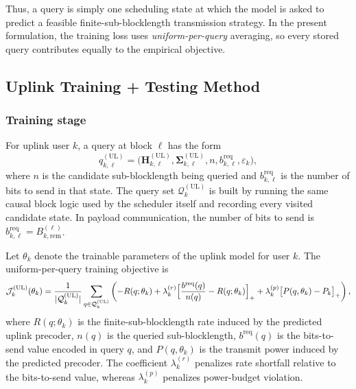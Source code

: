 \documentclass[11pt]{article}
\newcommand{\Qset}{\mathcal{Q}}
\newcommand{\Hc}{\mathbf{H}}
\newcommand{\Sig}{\mathbf{\Sigma}}
\newcommand{\UL}{\mathrm{UL}}
\begin{document}
Thus, a query is simply one scheduling state at which the model is asked to
predict a feasible finite-sub-blocklength transmission strategy. In the present
formulation, the training loss uses \emph{uniform-per-query} averaging, so every
stored query contributes equally to the empirical objective.

\subsection{Uplink Training + Testing Method}

\subsubsection{Training stage}

For uplink user $k$, a query at block $\ell$ has the form
\begin{equation}
q_{k,\ell}^{(\UL)}
=
\bigl(
\Hc_{k,\ell}^{(\UL)},
\Sig_{k,\ell}^{(\UL)},
n,
b_{k,\ell}^{\mathrm{req}},
\varepsilon_k
\bigr),
\label{eq:ul-query}
\end{equation}
where $n$ is the candidate sub-blocklength being queried and
$b_{k,\ell}^{\mathrm{req}}$ is the number of bits to send in that state. The
query set $\Qset_k^{(\UL)}$ is built by running the same causal block logic
used by the scheduler itself and recording every visited candidate state. In
payload communication, the number of bits to send is
$b_{k,\ell}^{\mathrm{req}} = B_{k,\mathrm{rem}}^{(\ell)}$.

Let $\theta_k$ denote the trainable parameters of the uplink model for user $k$.
The uniform-per-query training objective is
\begin{equation}
\mathcal{J}_k^{(\UL)}(\theta_k)
=
\frac{1}{\lvert\Qset_k^{(\UL)}\rvert}
\sum_{q\in\Qset_k^{(\UL)}}
\left(
-R(q;\theta_k)
+
\lambda_k^{(r)}\Bigl[\frac{b^{\mathrm{req}}(q)}{n(q)}-R(q;\theta_k)\Bigr]_+
+
\lambda_k^{(p)}\bigl[P(q,\theta_k)-P_k\bigr]_+
\right),
\label{eq:ul-training-objective}
\end{equation}
where $R(q;\theta_k)$ is the finite-sub-blocklength rate induced by the predicted
uplink precoder, $n(q)$ is the queried sub-blocklength, $b^{\mathrm{req}}(q)$ is
the bits-to-send value encoded in query $q$, and $P(q,\theta_k)$ is the
transmit power induced by the predicted precoder. The coefficient
$\lambda_k^{(r)}$ penalizes rate shortfall relative to the bits-to-send value,
whereas $\lambda_k^{(p)}$ penalizes power-budget violation.
\end{document}
